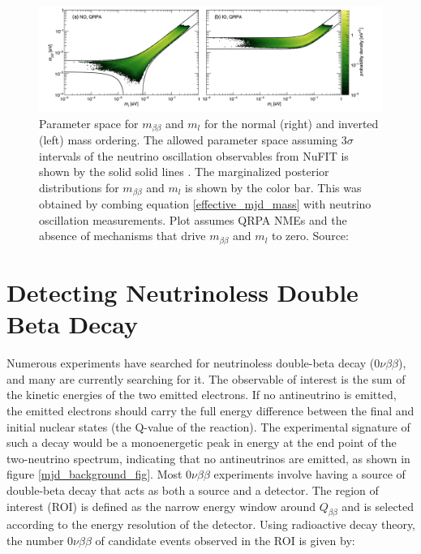 \begin{figure}[!htb]
\centering
\includegraphics[trim={0.6cm 0cm 1cm 0cm},clip,width=\linewidth]
{ch1/figs/benato_posterior.png}
\caption{Parameter space for $m_{\beta\beta}$ and $m_l$ for the normal (right) and inverted (left) mass ordering. The allowed parameter space assuming $3\sigma$ intervals of the neutrino oscillation observables from NuFIT is shown by the solid solid lines \cite{nufit}. The marginalized posterior distributions for $m_{\beta\beta}$ and $m_l$ is shown by the color bar. This was obtained by combing equation \ref{effective_mjd_mass} with neutrino oscillation measurements. Plot assumes QRPA NMEs and the absence of mechanisms that drive $m_{\beta\beta}$ and $m_l$ to zero. Source: \cite{PhysRevD.96.053001}}
\label{majorana_mass}
\end{figure}


\section{Detecting Neutrinoless Double Beta Decay}
Numerous experiments have searched for neutrinoless double-beta decay ($0\nu\beta\beta$), and many are currently searching for it. The observable of interest is the sum of the kinetic energies of the two emitted electrons. If no antineutrino is emitted, the emitted electrons should carry the full energy difference between the final and initial nuclear states (the Q-value of the reaction). The experimental signature of such a decay would be a monoenergetic peak in energy at the end point of the two-neutrino spectrum, indicating that no antineutrinos are emitted, as shown in figure \ref{mjd_background_fig}. Most $0\nu\beta\beta$ experiments involve having a source of double-beta decay that acts as both a source and a detector. The region of interest (ROI) is defined as the narrow energy window around $Q_{\beta\beta}$ and is selected according to the energy resolution of the detector. Using radioactive decay theory, the number $0\nu\beta\beta$ of candidate events observed in the ROI is given by: %

